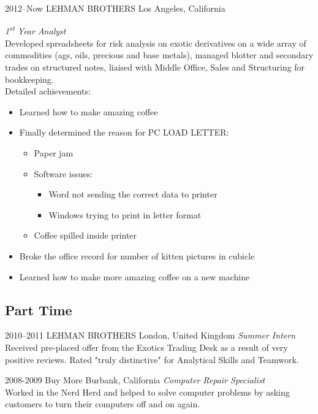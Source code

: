 \documentclass[]{friggeri-cv-a4}
\begin{document}
\begin{entrylist}


\entry
{2012--Now}
{LEHMAN BROTHERS}
{Los Angeles, California}
{\emph{1\textsuperscript{st} Year Analyst} \\
Developed spreadsheets for risk analysis on exotic derivatives on a wide array of commodities (ags, oils, precious and base metals), managed blotter and secondary trades on structured notes, liaised with Middle Office, Sales and Structuring for bookkeeping. \\
Detailed achievements:
\begin{itemize}
\item Learned how to make amazing coffee
\item Finally determined the reason for \textsc{PC LOAD LETTER}:
\begin{itemize}
\item Paper jam
\item Software issues:
\begin{itemize}
\item Word not sending the correct data to printer
\item Windows trying to print in letter format
\end{itemize}
\item Coffee spilled inside printer
\end{itemize}
\item Broke the office record for number of kitten pictures in cubicle
\item Learned how to make more amazing coffee on a new machine
\end{itemize}}


\end{entrylist}

\subsection{Part Time}

\begin{entrylist}

\entry
{2010--2011}
{LEHMAN BROTHERS}
{London, United Kingdom}
{\emph{Summer Intern} \\
Received pre-placed offer from the Exotics Trading Desk as a result of very positive reviews. Rated "truly distinctive" for Analytical Skills and Teamwork.}


\entry
{2008-2009}
{Buy More}
{Burbank, California}
{\emph{Computer Repair Specialist} \\
Worked in the Nerd Herd and helped to solve computer problems by asking customers to turn their computers off and on again.}


\end{entrylist}
\end{document}
